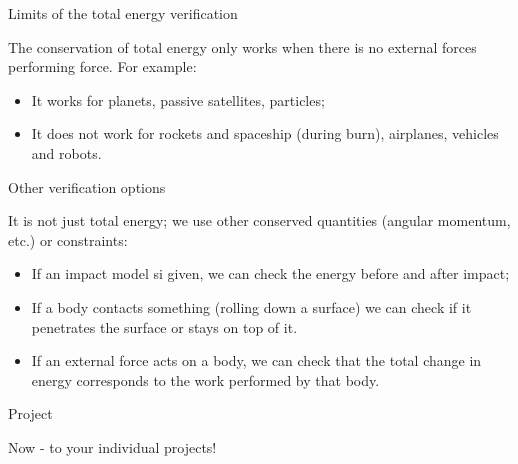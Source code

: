 \documentclass{beamer}
\begin{document}
\begin{frame}{Limits of the total energy verification}
	\begin{flushleft}
		
		The conservation of total energy only works when there is no external forces performing force. For example:
		
		\begin{itemize}
			\item It works for planets, passive satellites, particles;
			
			\item It does not work for rockets and spaceship (during burn), airplanes, vehicles and robots.
		\end{itemize}
		
	\end{flushleft}
\end{frame}



\begin{frame}{Other verification options}
	\begin{flushleft}
		
		It is not just total energy; we use other conserved quantities (angular momentum, etc.) or constraints:
		
		\begin{itemize}
	\item If an impact model si given, we can check the energy before and after impact;
	
	\item If a body contacts something (rolling down a surface) we can check if it penetrates the surface or stays on top of it.
	
	\item If an external force acts on a body, we can check that the total change in energy corresponds to the work performed by that body.
		\end{itemize}		
		
	\end{flushleft}
\end{frame}




\begin{frame}{Project}
	\begin{flushleft}
		
		\centerline{Now - to your individual projects!}
		
	\end{flushleft}
\end{frame}
\end{document}
